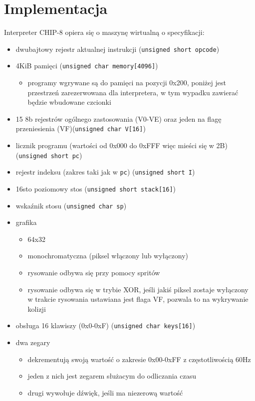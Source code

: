 \documentclass[a4paper,12pt]{report}
\begin{document}
\chapter{Implementacja}
\pagestyle{fancy}

Interpreter CHIP-8 opiera się o maszynę wirtualną o specyfikacji:
\begin{itemize}
    \item dwubajtowy rejestr aktualnej instrukcji (\verb+unsigned short opcode+)
    \item 4KiB pamięci (\verb+unsigned char memory[4096]+)
        \begin{itemize}
            \item programy wgrywane są do pamięci na pozycji 0x200, poniżej jest przestrzeń zarezerwowana dla interpretera, w tym wypadku zawierać będzie wbudowane czcionki
        \end{itemize}
    \item 15 8b rejestrów ogólnego zastosowania (V0-VE) oraz jeden na flagę przeniesienia (VF)(\verb+unsigned char V[16]+)
    \item licznik programu (wartości od 0x000 do 0xFFF więc mieści się w 2B) (\verb+unsigned short pc+)
    \item rejestr indeksu (zakres taki jak w \verb+pc+) (\verb+unsigned short I+)
    \item 16sto poziomowy stos (\verb+unsigned short stack[16]+)
    \item wskaźnik stosu (\verb+unsigned char sp+)
    \item grafika
        \begin{itemize}
            \item 64x32
            \item monochromatyczna (piksel włączony lub wyłączony)
            \item rysowanie odbywa się przy pomocy spritów
            \item rysowanie odbywa się w trybie XOR, jeśli jakiś piksel zostaje wyłączony w trakcie rysowania ustawiana jest flaga VF, pozwala to na wykrywanie kolizji
        \end{itemize}
    \item obsługa 16 klawiszy (0x0-0xF) (\verb+unsigned char keys[16]+)
    \item dwa zegary
        \begin{itemize}
            \item dekrementują swoją wartość o zakresie 0x00-0xFF z częstotliwością 60Hz
            \item jeden z nich jest zegarem służacym do odliczania czasu
            \item drugi wywołuje dźwięk, jeśli ma niezerową wartość
        \end{itemize}
\end{itemize}
\end{document}
